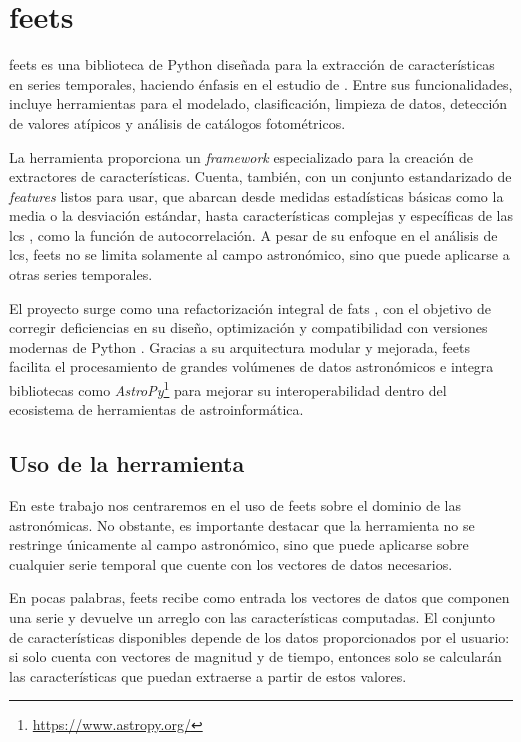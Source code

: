 \chapter[feATURE eXTRACTOR FOR tIME sERIES]{
    \acrlong{feets}
}
\label{chapter:feets}

\acrfull{feets} \citep{cabral2018feets} es una biblioteca de Python diseñada para la extracción de características en series temporales, haciendo énfasis en el estudio de . Entre sus funcionalidades, incluye herramientas para el modelado, clasificación, limpieza de datos, detección de valores atípicos y análisis de catálogos fotométricos.

La herramienta proporciona un \emph{framework} especializado para la creación de extractores de características. Cuenta, también, con un conjunto estandarizado de \emph{features} listos para usar, que abarcan desde medidas estadísticas básicas como la media o la desviación estándar, hasta características complejas y específicas de las \glspl{lc} \citep{gran2015bulge}, como la función de autocorrelación. A pesar de su enfoque en el análisis de \glspl{lc}, \gls{feets} no se limita solamente al campo astronómico, sino que puede aplicarse a otras series temporales.

El proyecto surge como una refactorización integral de \gls{fats} \citep{nun2015fatsfeatureanalysistime}, con el objetivo de corregir deficiencias en su diseño, optimización y compatibilidad con versiones modernas de Python \citep{cabral2018fatsfeetsimprovementsastronomical}. Gracias a su arquitectura modular y mejorada, \gls{feets} facilita el procesamiento de grandes volúmenes de datos astronómicos e integra bibliotecas como \emph{AstroPy}\footnote{\url{https://www.astropy.org/}} para mejorar su interoperabilidad dentro del ecosistema de herramientas de astroinformática.

\section{Uso de la herramienta}

En este trabajo nos centraremos en el uso de \gls{feets} sobre el dominio de las  astronómicas. No obstante, es importante destacar que la herramienta no se restringe únicamente al campo astronómico, sino que puede aplicarse sobre cualquier serie temporal que cuente con los vectores de datos necesarios.

En pocas palabras, \gls{feets} recibe como entrada los vectores de datos que componen una serie y devuelve un arreglo con las características computadas. El conjunto de características disponibles depende de los datos proporcionados por el usuario: si solo cuenta con vectores de magnitud y de tiempo, entonces solo se calcularán las características que puedan extraerse a partir de estos valores.

